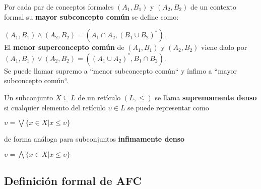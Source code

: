 \documentclass[../../main.tex]{subfiles}
\begin{document}
\begin{definicion}
Por cada par de conceptos formales $(A_1, B_1)$ y $(A_2, B_2)$ de un contexto formal su \textbf{mayor subconcepto común} se define como:
\begin{center}
    $(A_1, B_1) \wedge (A_2, B_2) = (A_1 \cap A_2, (B_1 \cup B_2)^{''}) $. \\
    El \textbf{menor superconcepto común} de $(A_1, B_1)$ y $(A_2, B_2)$ viene dado por \\
    $(A_1, B_1) \vee (A_2, B_2) = ((A_1 \cup A_2)^{''}, B_1 \cap B_2) $. \\
    Se puede llamar supremo a ``menor subconcepto común`` y ínfimo a ``mayor subconcepto común``.
\end{center}
\end{definicion}



\begin{definicion}
Un subconjunto $X \subseteq L$ de un retículo $(L, \leq)$ se llama \textbf{supremamente denso} si cualquier elemento del retículo $\upsilon \in L$ se puede representar como
\begin{center}
    $\upsilon = \bigvee \{ x \in X | x \leq \upsilon \}$
\end{center}
de forma análoga para subconjuntos \textbf{infimamente denso}
\begin{center}
    $\upsilon = \bigwedge \{ x \in X | x \leq \upsilon \}$
\end{center}
\end{definicion}

\newpage\cleardoublepage

\subsection{Definición formal de AFC}
\end{document}
